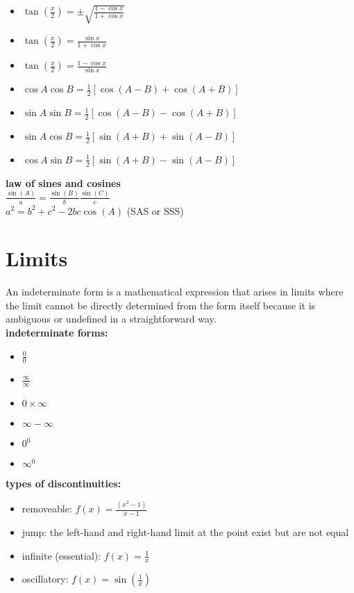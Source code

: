 \documentclass{article}
\begin{document}
\begin{itemize}
	\item $\tan\left(\frac{x}{2}\right) = \pm \sqrt{\frac{1 - \cos x}{1 + \cos x}}$
	\item $\tan\left(\frac{x}{2}\right) = \frac{\sin x}{1 + \cos x}$
	\item $\tan\left(\frac{x}{2}\right) = \frac{1 - \cos x}{\sin x}$
	\item $\cos A \cos B = \frac{1}{2} \left[ \cos(A - B) + \cos(A + B) \right]$
	\item $\sin A \sin B = \frac{1}{2} \left[ \cos(A - B) - \cos(A + B) \right]$
	\item $\sin A \cos B = \frac{1}{2} \left[ \sin(A + B) + \sin(A - B) \right]$
	\item $\cos A \sin B = \frac{1}{2} \left[ \sin(A + B) - \sin(A - B) \right]$
\end{itemize}

\textbf{law of sines and cosines}\\

	$\frac{\sin(A)}{a} = \frac{\sin(B)}{b} \frac{\sin(C)}{c}$\\

	$a^2 = b^2 + c^2 - 2bc\cos(A)$ (SAS or SSS)

\section*{Limits}

An indeterminate form is a mathematical expression that arises in limits where the limit cannot be directly determined from the form itself because it is ambiguous or undefined in a straightforward way.\\

\textbf{indeterminate forms:}
	\begin{itemize}
		\item $\frac{0}{0}$
		\item $\frac{\infty}{\infty}$
		\item $0 \times \infty$
		\item $\infty - \infty$
		\item $0^0$
		\item $\infty^0$
	\end{itemize}

\textbf{types of discontinuities:}
	\begin{itemize}
		\item removeable: $f(x) = \frac{(x^2 - 1)}{x - 1}$
		\item jump: the left-hand and right-hand limit at the point exist but are not equal
		\item infinite (essential): $f(x) = \frac{1}{x}$
		\item oscillatory: $f(x) = \sin(\frac{1}{x})$
	\end{itemize}
\end{document}
